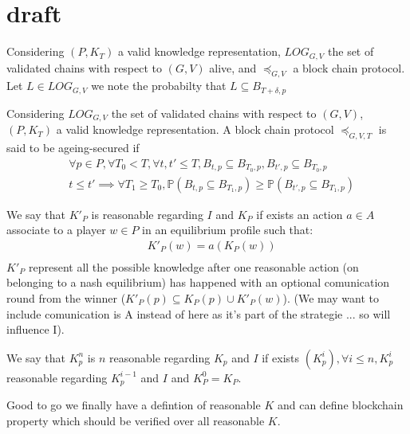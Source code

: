 \section{draft}
	
	\begin{mydef}
		Considering $(P,K_T)$ a valid knowledge representation, $LOG_{G,V}$ the set of validated chains with respect to $(G,V)$ alive, and $\preceq_{G,V}$ a block chain protocol. Let $L \in LOG_{G,V}$ we note 
		the probabilty that $L \subseteq B_{T+\delta,p}$  
	\end{mydef}
	
	
\begin{mydef}
	Considering $LOG_{G,V}$ the set of validated chains with respect to $(G,V)$, $(P,K_T)$ a valid knowledge representation. A block chain protocol $\preceq_{G,V,T}$ is said to be ageing-secured if
	\begin{eqnarray*}
		&\forall p \in P,\forall T_0 < T, \forall t,t' \leq T, B_{t,p} \subseteq B_{T_0,p}, B_{t',p} \subseteq B_{T_0,p} \\
		&t\leq t' \implies \forall T_1\geq T_0 , \mathbb{P}(B_{t,p}\subseteq B_{T_1,p}) \geq \mathbb{P}(B_{t',p}\subseteq B_{T_1,p})
	\end{eqnarray*}
\end{mydef}

\begin{mydef}
	We say that $K'_P$ is reasonable regarding $I$ and $K_P$ if exists an action $a \in A$ associate to a player $w \in P$ in an equilibrium profile such that: 	\begin{eqnarray*}	
		& K'_P(w) = a(K_P(w)) \\
	\end{eqnarray*}	
	$K'_P$ represent all the possible knowledge after one reasonable action (on belonging to a nash equilibrium) has happened with an optional comunication round from the winner ($K'_P(p) \subseteq K_P(p) \cup K'_P(w)$).  (We may want to include comunication is A instead of here as it's part of the strategie ... so will influence I).
\end{mydef}

\begin{mydef}
	We say that $K^n_p$ is $n$ reasonable regarding $K_p$ and $I$ if exists $(K^i_p), \forall i \leq n, K^i_p$ reasonable regarding $K^{i-1}_p$ and $I$ and $K^0_P = K_P$.   
\end{mydef}

Good to go we finally have a defintion of reasonable $K$ and can define blockchain property which should be verified over all reasonable $K$.

